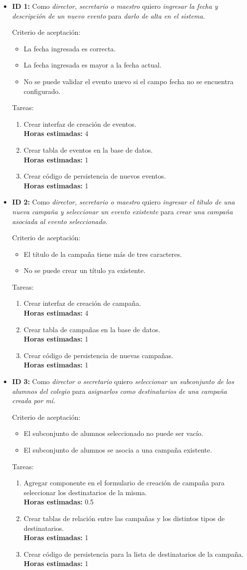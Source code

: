 \documentclass[a4paper, 10pt, twoside]{article}
\newenvironment{stories}{
  \begin{itemize}
}{
  \end{itemize}
}
\newcommand{\storyid}[4]{
  \item
  \textbf{ID #1:} Como \emph{#2} quiero \emph{#3} para \emph{#4}.
}
\newenvironment{tasks}{
  Tareas:
  \begin{enumerate}
}{
  \end{enumerate}
}
\newcommand{\task}[1] {
  \item #1.\\
  \textbf{Horas estimadas:}
}
\newenvironment{criterios}{
  Criterio de aceptación:
  \begin{itemize}
}{
  \end{itemize}
}
\newcommand{\criteria}[1] {
  \item #1
}
\begin{document}
\begin{stories}

  \storyid{1}
          {director, secretario o maestro}
          {ingresar la fecha y descripción de un nuevo evento}
          {darlo de alta en el sistema}
        
   \begin{criterios}
    \criteria{La fecha ingresada es correcta.}
  	\criteria{La fecha ingresada es mayor a la fecha actual.}
    \criteria{No se puede validar el evento nuevo si el campo fecha no se encuentra configurado.}
  \end{criterios} 
   
  \begin{tasks}
    \task{Crear interfaz de creación de eventos} 4
    \task{Crear tabla de eventos en la base de datos} 1
    \task{Crear código de persistencia de nuevos eventos} 1
  \end{tasks}


  \storyid{2}
          {director, secretario o maestro}
          {ingresar el título de una nueva campaña y seleccionar un evento existente}
          {crear una campaña asociada al evento seleccionado}
  
   \begin{criterios}
  	\criteria{El título de la campaña tiene más de tres caracteres.}
    \criteria{No se puede crear un título ya existente.}
  \end{criterios} 

  \begin{tasks}
    \task{Crear interfaz de creación de campaña} 4
    \task{Crear tabla de campañas en la base de datos} 1
    \task{Crear código de persistencia de nuevas campañas} 1
  \end{tasks}


  \storyid{3}
          {director o secretario}
          {seleccionar un subconjunto de los alumnos del colegio}
          {asignarlos como destinatarios de una campaña creada por mí}
        
   \begin{criterios}
  	\criteria{El subconjunto de alumnos seleccionado no puede ser vacío.}
    \criteria{El subconjunto de alumnos se asocia a una campaña existente.}
  \end{criterios} 

  \begin{tasks}
    \task{Agregar componente en el formulario de creación de campaña para seleccionar los destinatarios de la misma} 0.5
    \task{Crear tablas de relación entre las campañas y los distintos tipos de destinatarios} 1
    \task{Crear código de persistencia para la lista de destinatarios de la campaña} 1
  \end{tasks}



\end{stories}
\end{document}
